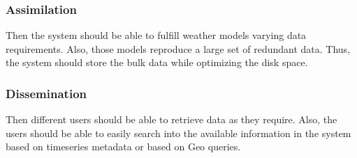 \subsubsection{Assimilation}
Then the system should be able to fulfill weather models varying data requirements. Also, those models reproduce a large set of redundant data. Thus, the system should store the bulk data while optimizing the disk space.
\subsubsection{Dissemination}
Then different users should be able to retrieve data as they require. Also, the users should be able to easily search into the available information in the system based on timeseries metadata or based on Geo queries.
